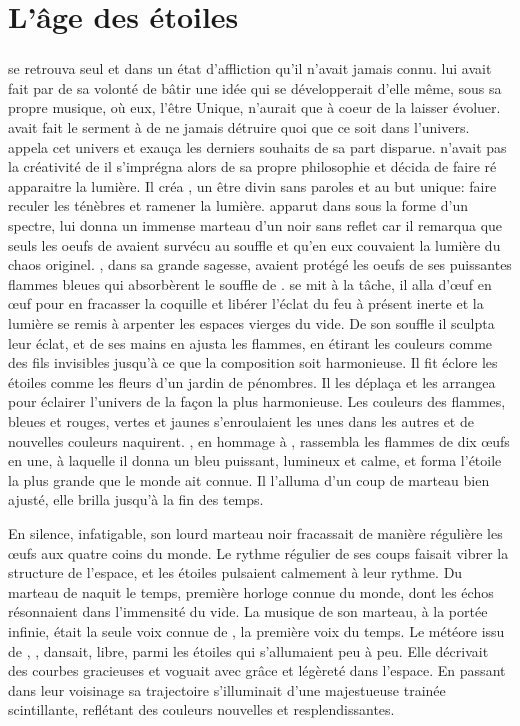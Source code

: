\chapter{L'âge des étoiles}

\subsection{\Cind}

\Cind se retrouva seul et dans un état d'affliction qu'il n'avait jamais connu. \Mey lui avait fait par de sa volonté de bâtir une idée qui se développerait d'elle même, sous sa propre musique, où eux, l'être Unique, n'aurait que à coeur de la laisser évoluer. \Cind avait fait le serment à \Mey de ne jamais détruire quoi que ce soit dans l'univers. \Cind appela cet univers \Dreyma et exauça les derniers souhaits de sa part disparue. \Cind n'avait pas la créativité de \Mey il s'imprégna alors de sa propre philosophie et décida de faire ré apparaitre la lumière. Il créa \Carac, un être divin sans paroles et au but unique: faire reculer les ténèbres et ramener la lumière. \Carac apparut dans \Dreyma sous la forme d'un spectre, \Cind lui donna un immense marteau d'un noir sans reflet car il remarqua que seuls les oeufs de \Tot avaient survécu au souffle et qu'en eux couvaient la lumière du chaos originel. \Boromu, dans sa grande sagesse, avaient protégé les oeufs de ses puissantes flammes bleues qui absorbèrent le souffle de \Cind.  \Carac se mit à la tâche, il alla d'œuf en œuf pour en fracasser la coquille et libérer l'éclat du feu à présent inerte et la lumière se remis à arpenter les espaces vierges du vide. De son souffle il sculpta leur éclat, et de ses mains en ajusta les flammes, en étirant les couleurs comme des fils invisibles jusqu'à ce que la composition soit harmonieuse. Il fit éclore les étoiles comme les fleurs d'un jardin de pénombres. Il les déplaça et les arrangea pour éclairer l'univers de la façon la plus harmonieuse. Les couleurs des flammes, bleues et rouges, vertes et jaunes s'enroulaient les unes dans les autres et de nouvelles couleurs naquirent. \Carac, en hommage à \Boromu, rassembla les flammes de dix œufs en une, à laquelle il donna un bleu puissant, lumineux et calme, et forma l'étoile la plus grande que le monde ait connue. Il l'alluma d'un coup de marteau bien ajusté, elle brilla jusqu'à la fin des temps. 

En silence, infatigable, son lourd marteau noir fracassait de manière régulière les œufs aux quatre coins du monde. Le rythme régulier de ses coups faisait vibrer la structure de l'espace, et les étoiles pulsaient calmement à leur rythme. Du marteau de \Carac naquit le temps, première horloge connue du monde, dont les échos résonnaient dans l'immensité du vide. La musique de son marteau, à la portée infinie, était la seule voix connue de \Carac, la première voix du temps. Le météore issu de \Mey, \Drisst, dansait, libre, parmi les étoiles qui s'allumaient peu à peu. Elle décrivait des courbes gracieuses et voguait avec grâce et légèreté dans l'espace. En passant dans leur voisinage sa trajectoire s'illuminait d'une majestueuse trainée scintillante, reflétant des couleurs nouvelles et resplendissantes.


